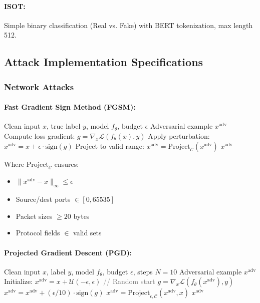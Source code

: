 \documentclass[12pt,a4paper]{article}
\theoremstyle{definition}
\begin{document}
\paragraph{ISOT:}
Simple binary classification (Real vs. Fake) with BERT tokenization, max length 512.

\subsection{Attack Implementation Specifications}

\subsubsection{Network Attacks}

\paragraph{Fast Gradient Sign Method (FGSM):}
\begin{algorithm}[H]
\caption{FGSM for Network Data}
\begin{algorithmic}[1]
\Require Clean input $x$, true label $y$, model $f_\theta$, budget $\epsilon$
\Ensure Adversarial example $x^{\text{adv}}$
\State Compute loss gradient: $g = \nabla_x \mathcal{L}(f_\theta(x), y)$
\State Apply perturbation: $x^{\text{adv}} = x + \epsilon \cdot \text{sign}(g)$
\State Project to valid range: $x^{\text{adv}} = \text{Project}_{\mathcal{C}}(x^{\text{adv}})$
\State \Return $x^{\text{adv}}$
\end{algorithmic}
\end{algorithm}

Where $\text{Project}_{\mathcal{C}}$ ensures:
\begin{itemize}
\item $\|x^{\text{adv}} - x\|_\infty \leq \epsilon$
\item Source/dest ports $\in [0, 65535]$
\item Packet sizes $\geq 20$ bytes
\item Protocol fields $\in$ valid sets
\end{itemize}

\paragraph{Projected Gradient Descent (PGD):}
\begin{algorithm}[H]
\caption{PGD for Network Data}
\begin{algorithmic}[1]
\Require Clean input $x$, label $y$, model $f_\theta$, budget $\epsilon$, steps $N=10$
\Ensure Adversarial example $x^{\text{adv}}$
\State Initialize: $x^{\text{adv}} = x + \mathcal{U}(-\epsilon, \epsilon)$ \quad \textcolor{gray}{// Random start}
  \State $g = \nabla_x \mathcal{L}(f_\theta(x^{\text{adv}}), y)$
  \State $x^{\text{adv}} = x^{\text{adv}} + (\epsilon/10) \cdot \text{sign}(g)$
  \State $x^{\text{adv}} = \text{Project}_{\epsilon, \mathcal{C}}(x^{\text{adv}}, x)$
\EndFor
\State \Return $x^{\text{adv}}$
\end{algorithmic}
\end{algorithm}
\end{document}
